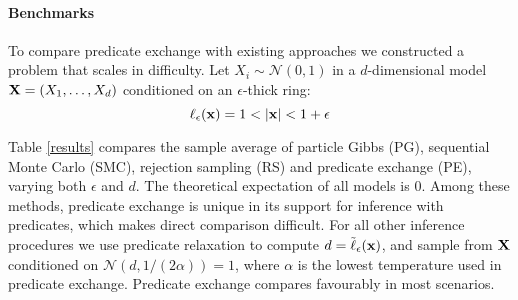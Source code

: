 


\paragraph{Benchmarks}
To compare predicate exchange with existing approaches we constructed a problem that scales in difficulty.
Let $X_i \sim \mathcal{N}(0,1)$ in a $d$-dimensional model $\mathbf{X} = (X_1, \dots, X_d)$ conditioned on an $\epsilon$-thick ring:
\begin{equation}
\operatorname{\ell}_\epsilon(\mathbf{x}) = 1 < |\mathbf{x}| < 1 + \epsilon
\end{equation}

Table \ref{results} compares the sample average of particle Gibbs (PG), sequential Monte Carlo (SMC), rejection sampling (RS) and predicate exchange (PE), varying both $\epsilon$ and $d$.
The theoretical expectation of all models is 0.
Among these methods, predicate exchange is unique in its support for inference with predicates, which makes direct comparison difficult.
For all other inference procedures we use predicate relaxation to compute $d = \tilde{\operatorname{\ell}}_\epsilon(\mathbf{x})$, and sample from $\mathbf{X}$ conditioned on $\mathcal{N}(d, 1/(2\alpha)) = 1$, where $\alpha$ is the lowest temperature used in predicate exchange.
Predicate exchange  compares favourably in most scenarios.


